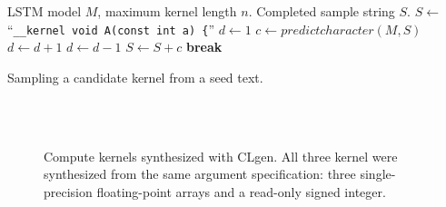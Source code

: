 \begin{algorithm}[t]
\begin{algorithmic}[1]
\Require LSTM model $M$, maximum kernel length $n$.
\Ensure Completed sample string $S$.
\State $S \gets$``\texttt{\_\_kernel void A(const int a) \{}''
\State $d \gets 1$
  \State $c \gets predictcharacter(M, S)$
    \State $d \gets d+1$
    \State $d \gets d-1$
  \EndIf
  \State $S \gets S + c$
    \State \textbf{break}
  \EndIf

\EndFor
\end{algorithmic}
\caption{Sampling a candidate kernel from a seed text.}
\label{alg:synthesis}
\end{algorithm}

\lstset{language=[OpenCL]C}
\begin{figure}
  \centering %
  \\%
  \subfloat[Zip operation which computes $c_i = 3a_i + 2b_i + 4$.]{%
    \noindent\mbox{\parbox{\columnwidth}{%
      }%
    }%
  }\\%
  \caption{Compute kernels synthesized with CLgen. All three kernel were synthesized from the same argument specification: three single-precision floating-point arrays and a read-only signed integer.}%
  \label{lst:ex}%
\end{figure}
